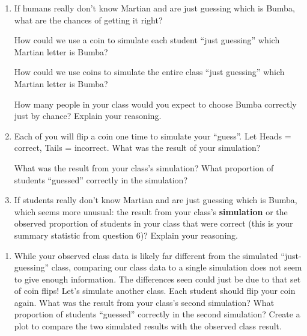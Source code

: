 \documentclass[
]{report}
\providecommand{\tightlist}{%
  \setlength{\itemsep}{0pt}\setlength{\parskip}{0pt}}
\begin{document}
\begin{enumerate}
\def\labelenumi{\arabic{enumi}.}
\setcounter{enumi}{8}
\item
  If humans really don't know Martian and are just guessing which is Bumba, what are the chances of getting it right?
  \vspace{0.3in}

  How could we use a coin to simulate each student ``just guessing'' which Martian letter is Bumba?
  \vspace{.9in}

  How could we use coins to simulate the entire class ``just guessing'' which Martian letter is Bumba?
  \vspace{.9in}

  How many people in your class would you expect to choose Bumba correctly just by chance? Explain your reasoning.
  \vspace{.9in}
\item
  Each of you will flip a coin one time to simulate your ``guess''. Let Heads = correct, Tails = incorrect. What was the result of your simulation?
  \vspace{.3in}

  What was the result from your class's simulation? What proportion of students ``guessed'' correctly in the simulation?
  \vspace{.3in}
\item
  If students really don't know Martian and are just guessing which is Bumba, which seems more unusual: the result from your class's \textbf{simulation} or the observed proportion of students in your class that were correct (this is your summary statistic from question 6)? Explain your reasoning.
\end{enumerate}

\newpage

\begin{enumerate}
\def\labelenumi{\arabic{enumi}.}
\setcounter{enumi}{11}
\tightlist
\item
  While your observed class data is likely far different from the simulated ``just-guessing'' class, comparing our class data to a single simulation does not seem to give enough information. The differences seen could just be due to that set of coin flips! Let's simulate another class. Each student should flip your coin again. What was the result from your class's second simulation? What proportion of students ``guessed'' correctly in the second simulation? Create a plot to compare the two simulated results with the observed class result.
\end{enumerate}
\end{document}
